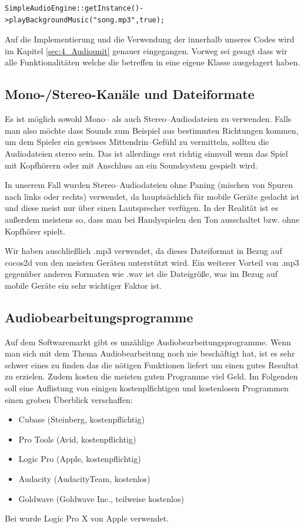 \begin{lstlisting}[style=singleline]
SimpleAudioEngine::getInstance()->playBackgroundMusic("song.mp3",true);
\end{lstlisting}

Auf die Implementierung und die Verwendung der  innerhalb unseres Codes wird im Kapitel \ref{sec:4_Audiounit} genauer eingegangen. Vorweg sei gesagt dass wir alle Funktionalitäten welche die  betreffen in eine eigene Klasse  ausgelagert haben.


\subsection{Mono-/Stereo-Kanäle und Dateiformate}
Es ist möglich sowohl Mono-- als auch Stereo--Audiodateien zu verwenden. Falls man also möchte dass Sounds zum Beispiel aus bestimmten Richtungen kommen, um dem Spieler ein gewisses Mittendrin--Gefühl zu vermitteln, sollten die Audiodateien stereo sein. Das ist allerdings erst richtig sinnvoll wenn das Spiel mit Kopfhörern oder mit Anschluss an ein Soundsystem gespielt wird. 

In unserem Fall wurden Stereo--Audiodateien ohne Paning (mischen von Spuren nach links oder rechts) verwendet, da \gamename hauptsächlich für mobile Geräte gedacht ist und diese meist nur über einen Lautsprecher verfügen. In der Realität ist es außerdem meistens so, dass man bei Handyspielen den Ton ausschaltet bzw. ohne Kopfhörer spielt.

Wir haben auschließlich .mp3 verwendet, da dieses Dateiformat in Bezug auf cocos2d von den meisten Geräten unterstützt wird. Ein weiterer Vorteil von .mp3 gegenüber anderen Formaten wie .wav ist die Dateigröße, was im Bezug auf mobile Geräte ein sehr wichtiger Faktor ist.


\subsection{Audiobearbeitungsprogramme}
Auf dem Softwaremarkt gibt es unzählige Audiobearbeitungsprogramme. Wenn man sich mit dem Thema Audiobearbeitung noch nie beschäftigt hat, ist es sehr schwer eines zu finden das die nötigen Funktionen liefert um einen gutes Resultat zu erzielen. Zudem kosten die meisten guten Programme viel Geld. Im Folgenden soll eine Auflistung von einigen kostenplfichtigen und kostenlosen Programmen einen groben Überblick verschaffen:

\begin{itemize}
 \item Cubase (Steinberg, kostenpflichtig)
 \item Pro Tools (Avid, kostenpflichtig)
 \item Logic Pro (Apple, kostenpflichtig)
 \item Audacity (AudacityTeam, kostenlos)
 \item Goldwave (Goldwave Inc., teilweise kostenlos)
 \end{itemize} 

Bei \gamename wurde Logic Pro X von Apple verwendet. 
